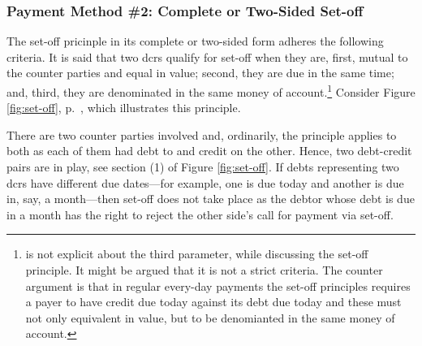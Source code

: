\subsubsection*{Payment Method \#2: Complete or Two-Sided Set-off}

The set-off pricinple in its complete or two-sided form adheres the following criteria. It is said that two \acfp{dcr} qualify for set-off when they are, first, mutual to the counter parties and equal in value; second, they are due in the same time; and, third, they are denominated in the same money of account.\footnote{\citeauthor{innes1913} is not explicit about the third parameter, while discussing the set-off principle. It might be argued that it is not a strict criteria. The counter argument is that in regular every-day payments the set-off principles requires a payer to have credit due today against its debt due today and these must not only equivalent in value, but to be denomianted in the same money of account.} Consider Figure \ref{fig:set-off}, p.~\pageref{fig:set-off}, which illustrates this principle.

There are two counter parties involved and, ordinarily, the principle applies to both as each of them had debt to and credit on the other. Hence, two debt-credit pairs are in play, see section (1) of Figure \ref{fig:set-off}. If debts representing two \acfp{dcr} have different due dates---for example, one is due today and another is due in, say, a month---then set-off does not take place as the debtor whose debt is due in a month has the right to reject the other side's call for payment via set-off.

